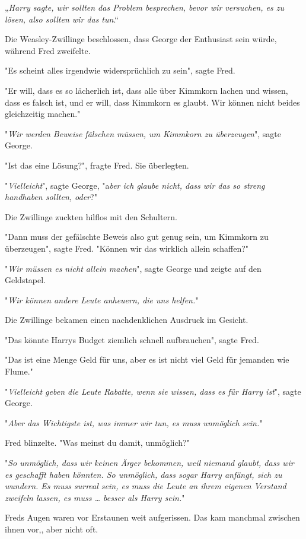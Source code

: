 {„\emph{Harry sagte, wir sollten das Problem besprechen, bevor wir versuchen, es zu lösen, also sollten wir das tun}.“

Die Weasley-Zwillinge beschlossen, dass George der Enthusiast sein würde, während Fred zweifelte.

"Es scheint alles irgendwie widersprüchlich zu sein", sagte Fred.

"Er will, dass es so lächerlich ist, dass alle über Kimmkorn lachen und wissen, dass es falsch ist, und er will, dass Kimmkorn es glaubt. Wir können nicht beides gleichzeitig machen."

"\emph{Wir werden Beweise fälschen müssen, um Kimmkorn zu überzeugen}", sagte George.

"Ist das eine Lösung?", fragte Fred. Sie überlegten.

"\emph{Vielleicht}", sagte George, "a\emph{ber ich glaube nicht, dass wir das so streng handhaben sollten, oder}?"

Die Zwillinge zuckten hilflos mit den Schultern.

"Dann muss der gefälschte Beweis also gut genug sein, um Kimmkorn zu überzeugen", sagte Fred. "Können wir das wirklich allein schaffen?"

"\emph{Wir müssen es nicht allein machen}", sagte George und zeigte auf den Geldstapel.

"\emph{Wir können andere Leute anheuern, die uns helfen.}"

Die Zwillinge bekamen einen nachdenklichen Ausdruck im Gesicht.

"Das könnte Harrys Budget ziemlich schnell aufbrauchen", sagte Fred.

"Das ist eine Menge Geld für uns, aber es ist nicht viel Geld für jemanden wie Flume."

"\emph{Vielleicht geben die Leute Rabatte, wenn sie wissen, dass es für Harry ist}", sagte George.

"\emph{Aber das Wichtigste ist, was immer wir tun, es muss unmöglich sein.}"

Fred blinzelte. "Was meinst du damit, unmöglich?"

"\emph{So unmöglich, dass wir keinen Ärger bekommen, weil niemand glaubt, dass wir es geschafft haben könnten. So unmöglich, dass sogar Harry anfängt, sich zu wundern. Es muss surreal sein, es muss die Leute an ihrem eigenen Verstand zweifeln lassen, es muss … besser als Harry sein.}"

Freds Augen waren vor Erstaunen weit aufgerissen. Das kam manchmal zwischen ihnen vor,, aber nicht oft.

}
